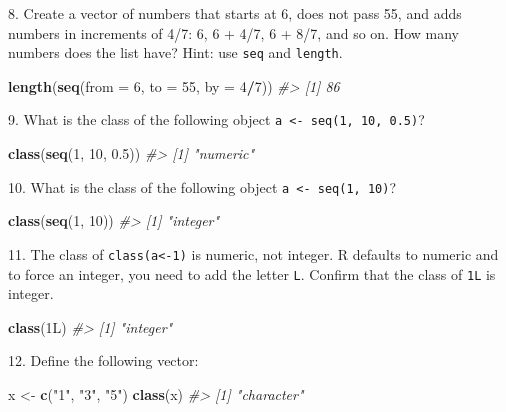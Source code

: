 \documentclass[
]{krantz}
\newenvironment{Shaded}{\begin{snugshade}}{\end{snugshade}}
\newcommand{\CommentTok}[1]{\textcolor[rgb]{0.37,0.37,0.37}{\textit{#1}}}
\newcommand{\DataTypeTok}[1]{\textcolor[rgb]{0.27,0.27,0.27}{#1}}
\newcommand{\DecValTok}[1]{\textcolor[rgb]{0.06,0.06,0.06}{#1}}
\newcommand{\FloatTok}[1]{\textcolor[rgb]{0.06,0.06,0.06}{#1}}
\newcommand{\KeywordTok}[1]{\textcolor[rgb]{0.27,0.27,0.27}{\textbf{#1}}}
\newcommand{\NormalTok}[1]{#1}
\newcommand{\OperatorTok}[1]{\textcolor[rgb]{0.43,0.43,0.43}{\textbf{#1}}}
\newcommand{\StringTok}[1]{\textcolor[rgb]{0.5,0.5,0.5}{#1}}
\begin{document}
8. Create a vector of numbers that starts at 6, does not pass 55, and adds numbers in increments of 4/7: 6, 6 + 4/7, 6 + 8/7, and so on. How many numbers does the list have? Hint: use \texttt{seq} and \texttt{length}.

\begin{Shaded}
\begin{Highlighting}[]
\KeywordTok{length}\NormalTok{(}\KeywordTok{seq}\NormalTok{(}\DataTypeTok{from =} \DecValTok{6}\NormalTok{, }\DataTypeTok{to =} \DecValTok{55}\NormalTok{, }\DataTypeTok{by =} \DecValTok{4}\OperatorTok{/}\DecValTok{7}\NormalTok{))}
\CommentTok{#> [1] 86}
\end{Highlighting}
\end{Shaded}

9. What is the class of the following object \texttt{a\ \textless{}-\ seq(1,\ 10,\ 0.5)}?

\begin{Shaded}
\begin{Highlighting}[]
\KeywordTok{class}\NormalTok{(}\KeywordTok{seq}\NormalTok{(}\DecValTok{1}\NormalTok{, }\DecValTok{10}\NormalTok{, }\FloatTok{0.5}\NormalTok{))}
\CommentTok{#> [1] "numeric"}
\end{Highlighting}
\end{Shaded}

10. What is the class of the following object \texttt{a\ \textless{}-\ seq(1,\ 10)}?

\begin{Shaded}
\begin{Highlighting}[]
\KeywordTok{class}\NormalTok{(}\KeywordTok{seq}\NormalTok{(}\DecValTok{1}\NormalTok{, }\DecValTok{10}\NormalTok{))}
\CommentTok{#> [1] "integer"}
\end{Highlighting}
\end{Shaded}

11. The class of \texttt{class(a\textless{}-1)} is numeric, not integer. R defaults to numeric and to force an integer, you need to add the letter \texttt{L}. Confirm that the class of \texttt{1L} is integer.

\begin{Shaded}
\begin{Highlighting}[]
\KeywordTok{class}\NormalTok{(1L)}
\CommentTok{#> [1] "integer"}
\end{Highlighting}
\end{Shaded}

12. Define the following vector:

\begin{Shaded}
\begin{Highlighting}[]
\NormalTok{x <-}\StringTok{ }\KeywordTok{c}\NormalTok{(}\StringTok{"1"}\NormalTok{, }\StringTok{"3"}\NormalTok{, }\StringTok{"5"}\NormalTok{)}
\KeywordTok{class}\NormalTok{(x)}
\CommentTok{#> [1] "character"}
\end{Highlighting}
\end{Shaded}
\end{document}

